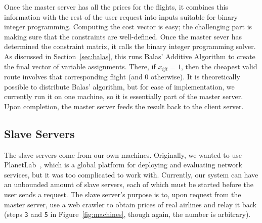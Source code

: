\documentclass{article}
\begin{document}
Once the master server has all the prices for the flights, it combines this information with the rest of the user request into inputs suitable for
binary integer programming. Computing the cost vector is easy; the challenging part is making sure that the constraints are well-defined. Once the
master sever has determined the constraint matrix, it calls the binary integer programming solver. As discussed in Section~\ref{sec:balas}, this runs
Balas' Additive Algorithm to create the final vector of variable assignments. There, if $x_{ijt} = 1$, then the cheapest valid route involves that
corresponding flight (and 0 otherwise). It is theoretically possible to distribute Balas' algorithm, but for ease of implementation, we currently run
it on one machine, so it is essentially part of the master server. Upon completion, the master server feeds the result back to the client server.


\subsection{Slave Servers}\label{sec:slave_server}

The slave servers come from our own machines. Originally, we wanted to use PlanetLab~\cite{conf/osdi/PetersonBFM06}, which is a global platform for
deploying and evaluating network services, but it was too complicated to work with. Currently, our system can have an unbounded amount of slave
servers, each of which must be started before the user sends a request. The slave server's purpose is to, upon request from the master server, use a
web crawler to obtain prices of real airlines and relay it back (steps \texttt{3} and \texttt{5} in Figure~\ref{fig:machines}, though again, the
number is arbitrary).
\end{document}
